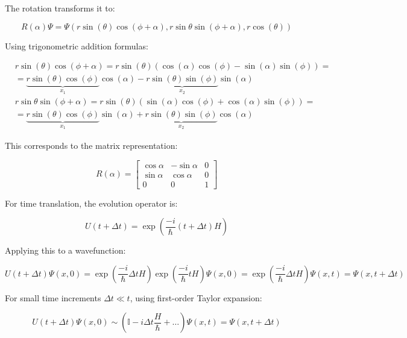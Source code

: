\documentclass[italian]{HKNdocument}
\begin{document}
The rotation transforms it to:

\begin{equation}
R(\alpha) \Psi=\Psi(r \sin (\theta) \cos (\phi+\alpha), r \sin \theta \sin (\phi+\alpha), r \cos (\theta)) \label{eq:10.52}
\end{equation}

Using trigonometric addition formulas:

\begin{align}
& r \sin (\theta) \cos (\phi+\alpha)=r \sin (\theta)(\cos (\alpha) \cos (\phi)-\sin (\alpha) \sin (\phi))= \\
& =\underbrace{r \sin (\theta) \cos (\phi)}_{x_{1}} \cos (\alpha)-\underbrace{r \sin (\theta) \sin (\phi)}_{x_{2}} \sin (\alpha)  \label{eq:10.53}\\
& r \sin \theta \sin (\phi+\alpha)=r \sin (\theta)(\sin (\alpha) \cos (\phi)+\cos (\alpha) \sin (\phi))= \\
& =\underbrace{r \sin (\theta) \cos (\phi)}_{x_{1}} \sin (\alpha)+\underbrace{r \sin (\theta) \sin (\phi)}_{x_{2}} \cos (\alpha) \label{eq:10.54}
\end{align}

This corresponds to the matrix representation:

\[
R(\alpha)=\left[\begin{array}{ccc}
\cos \alpha & -\sin \alpha & 0  \label{eq:10.55}\\
\sin \alpha & \cos \alpha & 0 \\
0 & 0 & 1
\end{array}\right]
\]

For time translation, the evolution operator is:

\begin{equation}
U(t+\Delta t)=\exp \left(\frac{-i}{\hbar}(t+\Delta t) H\right) \label{eq:10.56}
\end{equation}

Applying this to a wavefunction:

\begin{equation}
U(t+\Delta t) \Psi(x, 0)=\exp \left(\frac{-i}{\hbar} \Delta t H\right) \exp \left(\frac{-i}{\hbar} t H\right) \Psi(x, 0)=\exp \left(\frac{-i}{\hbar} \Delta t H\right) \Psi(x, t)=\Psi(x, t+\Delta t) \label{eq:10.57}
\end{equation}

For small time increments $\Delta t \ll t$, using first-order Taylor expansion:

\begin{equation}
U(t+\Delta t) \Psi(x, 0) \sim\left(\mathbb{I}-i \Delta t \frac{H}{\hbar}+\ldots\right) \Psi(x, t)=\Psi(x, t+\Delta t) \label{eq:10.58}
\end{equation}
\end{document}
